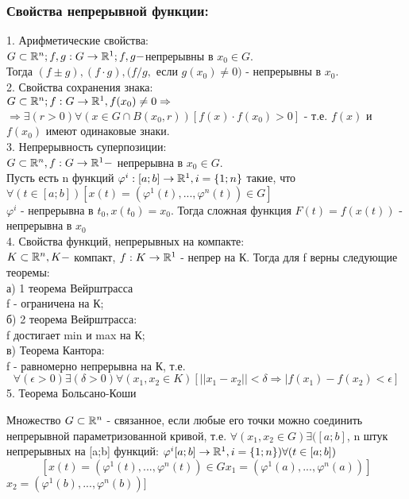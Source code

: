 \subsubsection{Свойства непрерывной функции:}
1. Арифметические свойства:
\\
$G\subset\mathbb{R}^n; f,g:G\to\mathbb{R}^1; f,g - $непрерывны в $x_0\in G.$
\\
Тогда $(f\pm g), (f\cdot g), (f/g,$ если $g(x_0)\ne 0)$ - непрерывны в $x_0.$
\\
2. Свойства сохранения знака:
\\
$G\subset\mathbb{R}^n; f:G\to\mathbb{R}^1, f(x_0)\ne 0\Rightarrow$
\\
$\Rightarrow\exists(r>0)\forall(x\in G\cap B(x_0,r))[f(x)\cdot f(x_0)>0]$ - т.е. $f(x)$ и $f(x_0)$ имеют одинаковые знаки.
\\
3. Непрерывность суперпозиции:
\\
$G\subset\mathbb{R}^n, f:G\to\mathbb{R}^1 -$ непрерывна в $x_0\in G.$
\\
Пусть есть n функций $\varphi^i:[a;b]\to\mathbb{R}^1, i=\{1;n\}$ такие, что $\forall(t\in[a;b])[x(t)=(\varphi^1(t),...,\varphi^n(t))\in G]$
\\
$\varphi^i$ - непрерывна в $t_0, x(t_0)=x_0.$ Тогда сложная функция $F(t) = f(x(t))$ - непрерывна в $x_0$
\\
4. Свойства функций, непрерывных на компакте:
\\
$K\subset\mathbb{R}^n, K -$ компакт, $f:K\to\mathbb{R}^1$ - непрер на К. Тогда для f верны следующие теоремы:
\\
	а) 1 теорема Вейрштрасса
	\\
		f - ограничена на К;
	\\
	б) 2 теорема Вейрштрасса:
	\\
		f достигает min и max на К;
	\\
	в) Теорема Кантора:
	\\
		f - равномерно непрерывна на К, т.е.
		$$
		\forall(\epsilon>0)\exists(\delta>0)\forall(x_1,x_2\in K)[||x_1-x_2||<\delta\Rightarrow|f(x_1)-f(x_2)<\epsilon]
		$$
5. Теорема Больсано-Коши
\begin{opred}
Множество $G\subset\mathbb{R}^n$ - связанное, если любые его точки можно соединить непрерывной параметризованной кривой, т.е. $\forall(x_1,x_2\in G)\exists([a;b]$, n штук непрерывных на [a;b] функций:
$
\varphi^i[a;b]\to\mathbb{R}^1, i=\{1;n\})\forall(t\in[a;b])$
$$
[x(t)=(\varphi^1(t),...,\varphi^n(t))\in G  x_1=(\varphi^1(a),...,\varphi^n(a))]
$$
$x_2=(\varphi^1(b),...,\varphi^n(b))]$
\end{opred}

